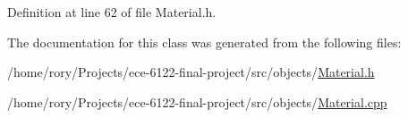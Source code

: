 Definition at line 62 of file Material.\+h.



The documentation for this class was generated from the following files\+:\begin{DoxyCompactItemize}
\item 
/home/rory/\+Projects/ece-\/6122-\/final-\/project/src/objects/\hyperlink{_material_8h}{Material.\+h}\item 
/home/rory/\+Projects/ece-\/6122-\/final-\/project/src/objects/\hyperlink{_material_8cpp}{Material.\+cpp}\end{DoxyCompactItemize}
